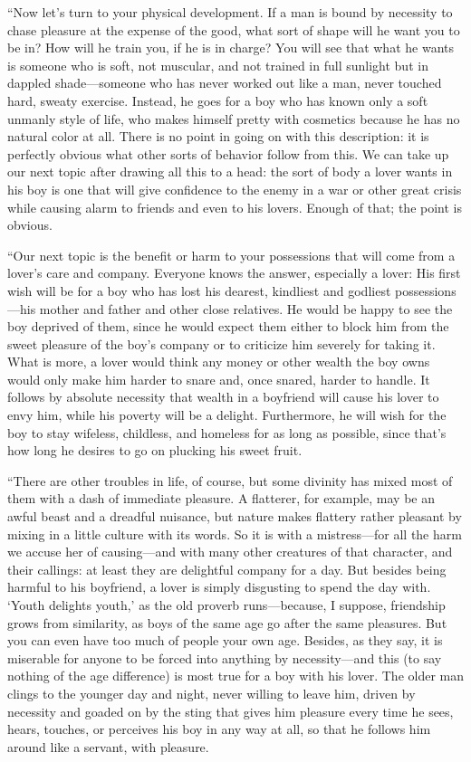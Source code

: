 “Now let’s turn to your physical development. If a man is bound by
necessity to chase pleasure at the expense of the good, what sort of
shape will he want you to be in? How will he train you, if he is in
charge? You will see that what he wants is someone who is soft, not
muscular, and not trained in full sunlight but in dappled
shade---someone who has never worked out like a man, never touched hard,
sweaty exercise. Instead, he goes for a boy who has known only a
soft unmanly style of life, who makes himself pretty with cosmetics
because he has no natural color at all. There is no point in going on
with this description: it is perfectly obvious what other sorts of
behavior follow from this. We can take up our next topic after drawing
all this to a head: the sort of body a lover wants in his boy is one
that will give confidence to the enemy in a war or other great crisis
while causing alarm to friends and even to his lovers. Enough of that;
the point is obvious.

“Our next topic is the benefit or harm to your possessions that
will come from a lover’s care and company. Everyone knows the answer,
especially a lover: His first wish will be for a boy who has lost his
dearest, kindliest and godliest possessions---his mother and father and
other close relatives. He would be happy to see the boy deprived of
them, since he would expect them either to block him
from the sweet pleasure of the boy’s company or to criticize him
severely for taking it. What is more, a lover would think any money or
other wealth the boy owns would only make him harder to snare and, once
snared, harder to handle. It follows by absolute necessity that wealth
in a boyfriend will cause his lover to envy him, while his poverty will
be a delight. Furthermore, he will wish for the boy to stay wifeless,
childless, and homeless for as long as possible, since that’s how long
he desires to go on plucking his sweet fruit.

“There are other troubles in life, of course, but some divinity has
mixed most of them with a dash of immediate pleasure. A flatterer, for
example, may be an awful beast and a dreadful nuisance, but
nature makes flattery rather pleasant by mixing in a little culture with
its words. So it is with a mistress---for all the harm we accuse her of
causing---and with many other creatures of that character, and their
callings: at least they are delightful company for a day. But besides
being harmful to his boyfriend, a lover is simply disgusting to
spend the day with. ‘Youth delights youth,’ as the old proverb
runs---because, I suppose, friendship grows from similarity, as boys of
the same age go after the same pleasures. But you can even have too much
of people your own age. Besides, as they say, it is miserable for anyone
to be forced into anything by necessity---and this (to say nothing of
the age difference) is most true for a boy with his lover. The older man
clings to the younger day and night, never willing to leave him, driven 
by necessity and goaded on by the sting that gives him pleasure
every time he sees, hears, touches, or perceives his boy in any way at
all, so that he follows him around like a servant, with pleasure.

